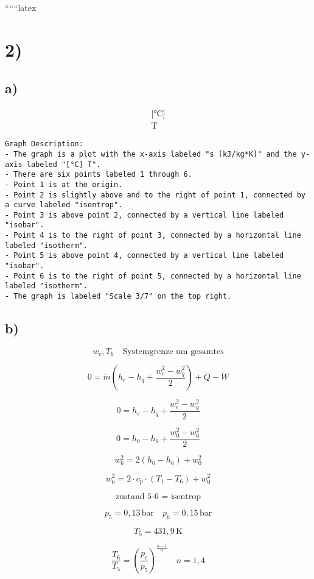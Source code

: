 
``````latex


\section*{2)}

\subsection*{a)}

\[
\begin{array}{c}
\text{[°C]} \\
\text{T}
\end{array}
\]

\begin{verbatim}
Graph Description:
- The graph is a plot with the x-axis labeled "s [kJ/kg*K]" and the y-axis labeled "[°C] T".
- There are six points labeled 1 through 6.
- Point 1 is at the origin.
- Point 2 is slightly above and to the right of point 1, connected by a curve labeled "isentrop".
- Point 3 is above point 2, connected by a vertical line labeled "isobar".
- Point 4 is to the right of point 3, connected by a horizontal line labeled "isotherm".
- Point 5 is above point 4, connected by a vertical line labeled "isobar".
- Point 6 is to the right of point 5, connected by a horizontal line labeled "isotherm".
- The graph is labeled "Scale 3/7" on the top right.
\end{verbatim}

\subsection*{b)}

\[
w_c, T_6 \quad \text{Systemgrenze um gesamtes}
\]

\[
0 = \dot{m} \left( h_e - h_q + \frac{w_e^2 - w_q^2}{2} \right) + \dot{Q} - \dot{W}
\]

\[
0 = h_e - h_q + \frac{w_e^2 - w_q^2}{2}
\]

\[
0 = h_0 - h_6 + \frac{w_0^2 - w_6^2}{2}
\]

\[
w_6^2 = 2 \left( h_0 - h_6 \right) + w_0^2
\]

\[
w_6^2 = 2 \cdot c_p \cdot \left( T_1 - T_6 \right) + w_0^2
\]

\[
\text{zustand 5-6 = isentrop}
\]

\[
p_5 = 0,13 \, \text{bar} \quad p_6 = 0,15 \, \text{bar}
\]

\[
T_5 = 431,9 \, \text{K}
\]

\[
\frac{T_6}{T_5} = \left( \frac{p_c}{p_5} \right)^{\frac{n-1}{n}} \quad n = 1,4
\]

